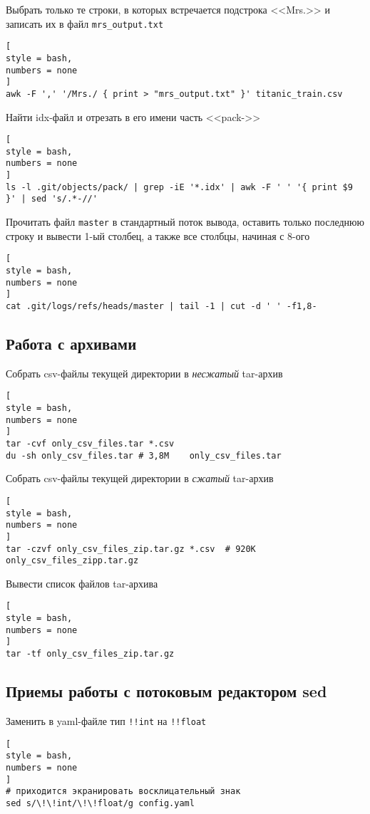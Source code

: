 \documentclass[%
	11pt,
	a4paper,
	utf8,
		]{article}
\begin{document}
Выбрать только те строки, в которых встречается подстрока <<Mrs.>> и записать их в файл \verb|mrs_output.txt|
\begin{lstlisting}[
style = bash,
numbers = none
]
awk -F ',' '/Mrs./ { print > "mrs_output.txt" }' titanic_train.csv
\end{lstlisting}

Найти idx-файл и отрезать в его имени часть <<pack->>

\begin{lstlisting}[
style = bash,
numbers = none
]
ls -l .git/objects/pack/ | grep -iE '*.idx' | awk -F ' ' '{ print $9 }' | sed 's/.*-//'
\end{lstlisting}

Прочитать файл \texttt{master} в стандартный поток вывода, оставить только последнюю строку и вывести 1-ый столбец, а также все столбцы, начиная с 8-ого
\begin{lstlisting}[
style = bash,
numbers = none
]
cat .git/logs/refs/heads/master | tail -1 | cut -d ' ' -f1,8-
\end{lstlisting}


\subsection{Работа с архивами}

Собрать csv-файлы текущей директории в \emph{несжатый} tar-архив 
\begin{lstlisting}[
style = bash,
numbers = none	
]
tar -cvf only_csv_files.tar *.csv
du -sh only_csv_files.tar # 3,8M	only_csv_files.tar
\end{lstlisting}

Собрать csv-файлы текущей директории в \emph{сжатый} tar-архив 
\begin{lstlisting}[
style = bash,
numbers = none	
]
tar -czvf only_csv_files_zip.tar.gz *.csv  # 920K	only_csv_files_zipp.tar.gz
\end{lstlisting}

Вывести список файлов tar-архива
\begin{lstlisting}[
style = bash,
numbers = none	
]
tar -tf only_csv_files_zip.tar.gz
\end{lstlisting}

\subsection{Приемы работы с потоковым редактором sed}

Заменить в yaml-файле тип \verb|!!int| на \verb|!!float|
\begin{lstlisting}[
style = bash,
numbers = none	
]
# приходится экранировать восклицательный знак
sed s/\!\!int/\!\!float/g config.yaml
\end{lstlisting}
\end{document}
